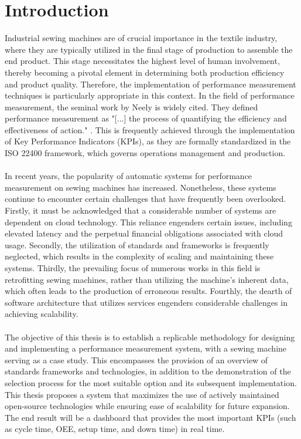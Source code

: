 \clearpage
\chapter{\textbf{Introduction}}\label{introduction}
Industrial sewing machines are of crucial importance in the textile industry, where they are typically utilized in the final stage of production to assemble the end product. This stage necessitates the highest level of human involvement, thereby becoming a pivotal element in determining both production efficiency and product quality. Therefore, the implementation of performance measurement techniques is particularly appropriate in this context. In the field of performance measurement, the seminal work by Neely \cite{neelyPerformanceMeasurementSystem1995} is widely cited. They defined performance measurement as "[...] the process of quantifying the efficiency and effectiveness of action." . This is frequently achieved through the implementation of Key Performance Indicators (KPIs), as they are formally standardized in the ISO 22400 framework, which governs operations management and production.
\\\\
In recent years, the popularity of automatic systems for performance measurement on sewing machines has increased. Nonetheless, these systems continue to encounter certain challenges that have frequently been overlooked. Firstly, it must be acknowledged that a considerable number of systems are dependent on cloud technology. This reliance engenders certain issues, including elevated latency and the perpetual financial obligations associated with cloud usage. Secondly, the utilization of standards and frameworks is frequently neglected, which results in the complexity of scaling and maintaining these systems. Thirdly, the prevailing focus of numerous works in this field is retrofitting sewing machines, rather than utilizing the machine's inherent data, which often leads to the production of erroneous results. Fourthly, the dearth of software architecture that utilizes services engenders considerable challenges in achieving scalability.
\\\\
The objective of this thesis is to establish a replicable methodology for designing and implementing a performance measurement system, with a sewing machine serving as a case study. This encompasses the provision of an overview of standards frameworks and technologies, in addition to the demonstration of the selection process for the most suitable option and its subsequent implementation. This thesis proposes a system that maximizes the use of actively maintained open-source technologies while ensuring ease of scalability for future expansion. The end result will be a dashboard that provides the most important KPIs (such as cycle time, OEE, setup time, and down time) in real time.
